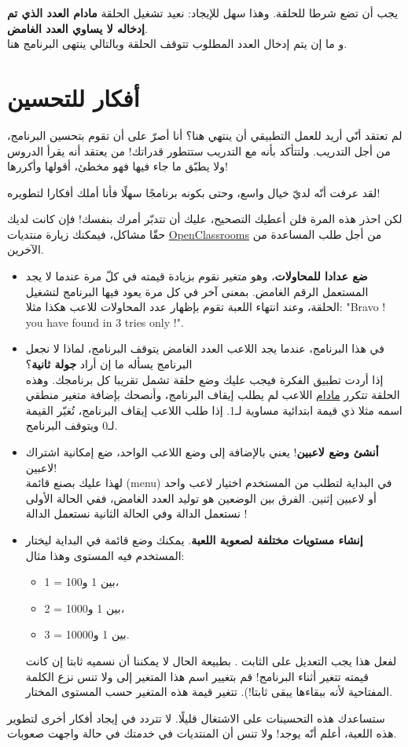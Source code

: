 يجب أن تضع شرطا للحلقة. وهذا سهل للإيجاد: نعيد تشغيل الحلقة 
\textbf{مادام العدد الذي تم إدخاله لا يساوي العدد الغامض}.\\
و ما إن يتم إدخال العدد المطلوب تتوقف الحلقة وبالتالي ينتهى البرنامج هنا.

\section*{أفكار للتحسين}

لم تعتقد أنّي أريد للعمل التطبيقي أن ينتهي هنا؟ أنا أصرّ على أن تقوم بتحسين البرنامج، من أجل التدريب. ولتتأكد بأنه مع التدريب ستتطور قدراتك! من يعتقد أنه يقرأ الدروس ولا يطبّق ما جاء فيها فهو مخطئ، أقولها وأكررها!

لقد عرفت أنّه لديّ خيال واسع، وحتى بكونه برنامجًا سهلًا فأنا أملك أفكارا لتطويره!

لكن احذر هذه المرة فلن أعطيك التصحيح، عليك أن تتدبّر أمرك بنفسك! فإن كانت لديك حقّا مشاكل، فيمكنك زيارة منتديات 
\href{http://www.siteduzero.com/forum-81-126-langage-c.html}{\textenglish{OpenClassrooms}}
من أجل طلب المساعدة من الآخرين.

\begin{itemize}
	\item \textbf{ضع عدادا للمحاولات}،
 وهو متغير نقوم بزيادة قيمته في كلّ مرة عندما لا يجد المستعمل الرقم الغامض. بمعنى آخر في كل مرة يعود فيها البرنامج لتشغيل الحلقة، وعند انتهاء اللعبة تقوم بإظهار عدد المحاولات للاعب هكذا مثلا:
	"\textenglish{Bravo ! you have found in 3 tries only !}".
	\item في هذا البرنامج، عندما يجد اللاعب العدد الغامض يتوقف البرنامج، لماذا لا نجعل البرنامج يسأله ما إن أراد 
	\textbf{جولة ثانية}؟\\
	إذا أردت تطبيق الفكرة فيجب عليك وضع حلقة تشمل تقريبا كل برنامجك. وهذه الحلقة تتكرر 
	\underline{مادام}
	اللاعب لم يطلب إيقاف البرنامج، وأنصحك بإضافة متغير منطقي اسمه مثلا
ذي قيمة ابتدائية مساوية لـ1. إذا طلب اللاعب إيقاف البرنامج، تُغيّر القيمة لـ0 ويتوقف البرنامج.
	\item \textbf{أنشئ وضع لاعبين}!
	 يعني بالإضافة إلى وضع اللاعب الواحد، ضع إمكانية اشتراك لاعبين!\\
	 لهذا عليك بصنع قائمة
	 (\textenglish{menu})
	 في البداية لتطلب من المستخدم اختيار لاعب واحد أو لاعبين إثنين. الفرق بين الوضعين هو توليد العدد الغامض، ففي الحالة الأولى نستعمل الدالة 
	 وفي الحالة الثانية نستعمل الدالة
	 !
	 \item \textbf{إنشاء مستويات مختلفة لصعوبة اللعبة}.
	  يمكنك وضع قائمة في البداية ليختار المستخدم فيه المستوى وهذا مثال:
	 \begin{itemize}
	 	\item 1 = بين 1 و100،
	 	\item 2 = بين 1 و1000،
	 	\item 3 = بين 1 و10000.
	 \end{itemize}
 لفعل هذا يجب التعديل على الثابت
 .
 بطبيعة الحال لا يمكننا أن نسميه ثابتا إن كانت قيمته تتغير أثناء البرنامج! قم بتغيير اسم هذا المتغير إلى 
  ولا تنس نزع الكلمة المفتاحية 
 لأنه ببقاءها يبقى ثابتا!). تتغير قيمة هذه المتغير حسب المستوى المختار.
\end{itemize}

ستساعدك هذه التحسينات على الاشتغال قليلًا. لا تتردد في إيجاد أفكار أخرى لتطوير هذه اللعبة، أعلم أنّه يوجد! ولا تنس أن المنتديات في خدمتك في حالة واجهت صعوبات.
